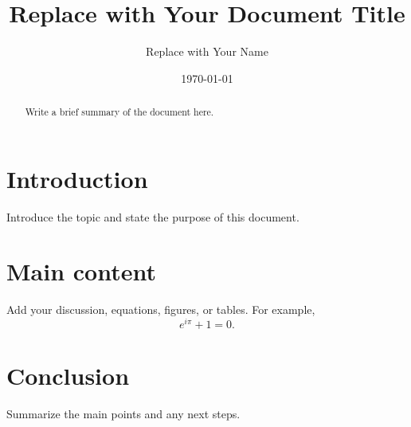 \documentclass[11pt]{article}
\title{Replace with Your Document Title}
\author{Replace with Your Name}
\date{\today}
\begin{document}
\maketitle

\begin{abstract}
Write a brief summary of the document here.
\end{abstract}

\section{Introduction}
Introduce the topic and state the purpose of this document.

\section{Main content}
Add your discussion, equations, figures, or tables. For example,
\[
  e^{i\pi}+1=0.
\]

\section{Conclusion}
Summarize the main points and any next steps.
\end{document}
